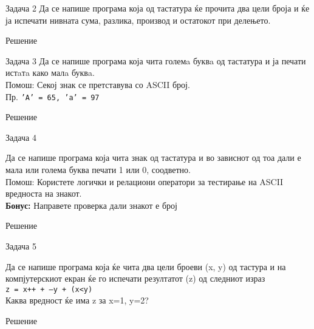 \begin{frame}[fragile]{Задача 2}
Да се напише програма која од тастатура ќе прочита два цели броја и ќе ја испечати нивната сума, 
разлика, производ и остатокот при делењето.
	\begin{exampleblock}{Решение}
		
	\end{exampleblock}
\end{frame}

\begin{frame}[fragile]{Задача 3}
Да се напише програма која чита големa буквa од тастатура и ја печати истaтa како малa буквa.\\
Помош: Секој знак се претставува со ASCII број.\\
Пр. \texttt{'А' = 65, 'а' = 97}
	\begin{exampleblock}{Решение}
		
	\end{exampleblock}
\end{frame}

\begin{frame}[fragile]{Задача 4}
\begin{scriptsize}
Да се напише програма која чита знак од тастатура и во зависнот од тоа дали е мала или голема буква печати 1 или 0, соодветно.\\
Помош: Користете логички и релациони оператори за тестирање на ASCII вредноста на знакот.\\
\textbf{Бонус:} Направете проверка дали знакот е број	
\end{scriptsize}
\begin{exampleblock}{Решение}
			
\end{exampleblock}
\end{frame}

\begin{frame}[fragile]{Задача 5}
\begin{scriptsize}
Да се напише програма која ќе чита два цели броеви (x, y) од тастура и на компјутерскиот екран ќе го испечати резултатот (z) од следниот израз\\
\texttt{z = x++ + --y + (x<y)}\\
Каква вредност ќе има z за x=1, y=2?
\end{scriptsize}
	\begin{exampleblock}{Решение}
		
	\end{exampleblock}
\end{frame}

